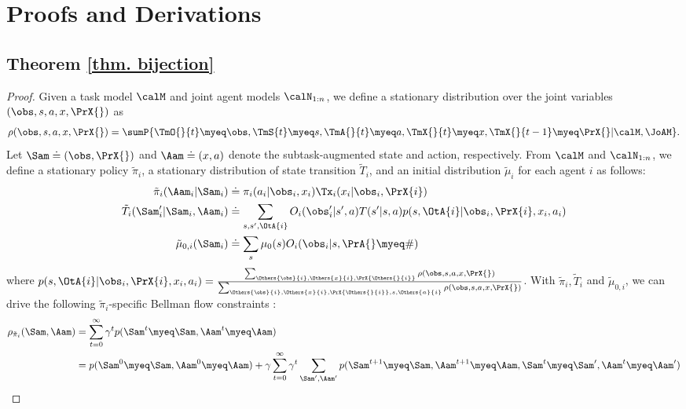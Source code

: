 \onecolumn
\section{Proofs and Derivations}
\subsection{Theorem \ref{thm. bijection}}
\newcommand{\VWoccu}{\textsf{\Sam\Aam}}
\newcommand{\OMfull}{\rho(\obs, s, a, x, \PrX{}) }
\newcommand{\pimerged}{\tilde{\pi}_i(a, x|\obs, \PrX{})}
\newcommand{\PiParamk}{\PiParam^k}
\newcommand{\TxParamk}{\TxParam^k}
\begin{proof}
Given a task model $\calM$ and joint agent models $\calN_{1:n}$, we define a stationary distribution over the joint variables $(\obs, s, a, x, \PrX{})$ as 
\begin{align*}
    \OMfull = \sumP{\TmO{}{t}\myeq\obs, \TmS{t}\myeq s, \TmA{}{t}\myeq a, \TmX{}{t}\myeq x, \TmX{}{t-1}\myeq\PrX{}|\calM, \JoAM}.
\end{align*}
Let $\Sam \doteq(\obs, \PrX{})$ and $\Aam \doteq(x, a)$ denote the subtask-augmented state and action, respectively. From $\calM$ and $\calN_{1:n}$, we define a stationary policy $\tilde{\pi}_i$, a stationary distribution of state transition $\tilde{T}_i$, and an initial distribution $\tilde{\mu}_i$ for each agent $i$ as follows:
\begin{align*}
    \tilde{\pi}_i(\Aam_i|\Sam_i) &\doteq \pi_i(a_i|\obs_i, x_i)\Tx_i(x_i|\obs_i, \PrX{i}) \\
    \tilde{T}_i(\Sam'_i|\Sam_i, \Aam_i)&\doteq\sum_{s, s', \OtA{i}}O_i(\obs_i'|s', a)T(s'|s, a)p(s, \OtA{i}|\obs_i, \PrX{i}, x_i, a_i) \\
    \tilde{\mu}_{0, i}(\Sam_i) &\doteq \sum_s \mu_0(s)O_i(\obs_i|s, \PrA{}\myeq\#)
\end{align*}
where $p(s, \OtA{i}|\obs_i, \PrX{i}, x_i, a_i) = \frac{\sum_{\Others{\obs}{i},\Others{x}{i}, \PrX{\Others{}{i}}} \OMfull}{\sum_{\Others{\obs}{i},\Others{x}{i}, \PrX{\Others{}{i}}, s, \Others{a}{i}} \OMfull}$. 
With $\tilde{\pi}_i,\tilde{T}_i$ and $\tilde{\mu}_{0, i}$, we can drive the following $\tilde{\pi}_i$-specific Bellman flow constraints \cite{puterman1990markov}:
\begin{align*}
    \rho_{\tilde{\pi}_i}(\Sam, \Aam) &= \sum_{t=0}^\infty \gamma^t p(\Sam^t\myeq \Sam, \Aam^t\myeq \Aam) \\
    &= p(\Sam^0\myeq \Sam, \Aam^0\myeq \Aam) + \gamma\sum_{t=0}^\infty \gamma^t \sum_{\Sam', \Aam'}p(\Sam^{t+1}\myeq \Sam, \Aam^{t+1}\myeq \Aam, \Sam^t\myeq \Sam', \Aam^t\myeq \Aam') \\

\end{align*}
\end{proof}
